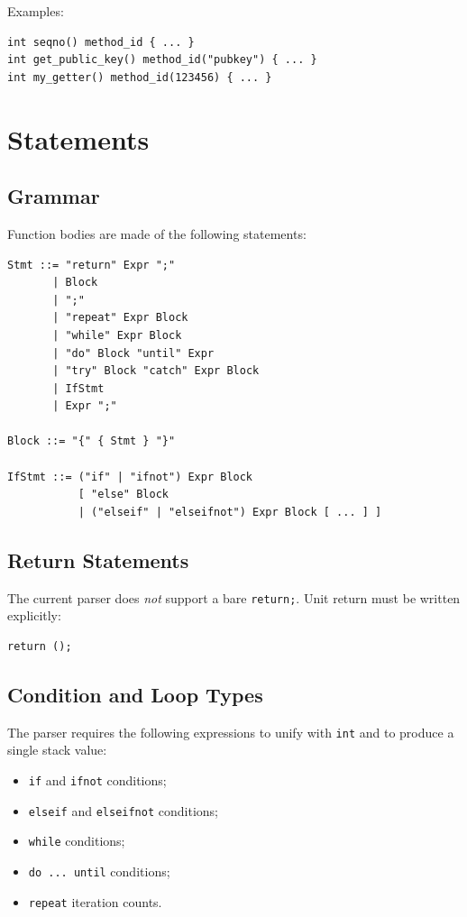 \documentclass[12pt,oneside]{article}
\begin{document}
Examples:

\begin{verbatim}
int seqno() method_id { ... }
int get_public_key() method_id("pubkey") { ... }
int my_getter() method_id(123456) { ... }
\end{verbatim}

\section{Statements}
\label{sec:statements}
\subsection{Grammar}
Function bodies are made of the following statements:

\begin{verbatim}
Stmt ::= "return" Expr ";"
       | Block
       | ";"
       | "repeat" Expr Block
       | "while" Expr Block
       | "do" Block "until" Expr
       | "try" Block "catch" Expr Block
       | IfStmt
       | Expr ";"

Block ::= "{" { Stmt } "}"

IfStmt ::= ("if" | "ifnot") Expr Block
           [ "else" Block
           | ("elseif" | "elseifnot") Expr Block [ ... ] ]
\end{verbatim}

\subsection{Return Statements}
The current parser does \emph{not} support a bare \verb|return;|. Unit return
must be written explicitly:

\begin{verbatim}
return ();
\end{verbatim}

\subsection{Condition and Loop Types}
The parser requires the following expressions to unify with \verb|int| and to
produce a single stack value:

\begin{itemize}
\item \verb|if| and \verb|ifnot| conditions;
\item \verb|elseif| and \verb|elseifnot| conditions;
\item \verb|while| conditions;
\item \verb|do ... until| conditions;
\item \verb|repeat| iteration counts.
\end{itemize}
\end{document}
